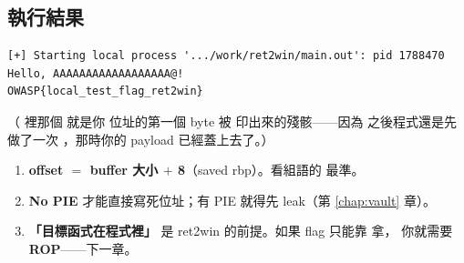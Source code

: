 \subsection{執行結果}

\begin{lstlisting}[style=raw]
[+] Starting local process '.../work/ret2win/main.out': pid 1788470
Hello, AAAAAAAAAAAAAAAAAA@!
OWASP{local_test_flag_ret2win}
\end{lstlisting}

（ 裡那個  就是你  位址的第一個 byte 
被  印出來的殘骸——因為  之後程式還是先做了一次
，那時你的 payload 已經蓋上去了。）

\begin{keybox}[這題你要帶走的三件事]
\begin{enumerate}[leftmargin=1.4em,itemsep=1pt]
  \item \textbf{offset $=$ buffer 大小 $+$ 8}（saved rbp）。看組語的  最準。
  \item \textbf{No PIE} 才能直接寫死位址；有 PIE 就得先 leak（第 \ref{chap:vault} 章）。
  \item \textbf{「目標函式在程式裡」} 是 ret2win 的前提。如果 flag 只能靠  拿，
        你就需要 \textbf{ROP}——下一章。
\end{enumerate}
\end{keybox}
